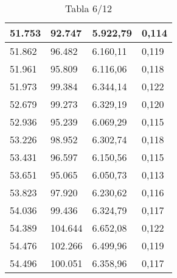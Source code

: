 \begin{table}[H]
{\begin{tabular}{| l | l | l |l |}
51.753	&	92.747	&	5.922,79	&	0,114	\\ \hline
51.862	&	96.482	&	6.160,11	&	0,119	\\ \hline
51.961	&	95.809	&	6.116,06	&	0,118	\\ \hline
51.973	&	99.384	&	6.344,14	&	0,122	\\ \hline
52.679	&	99.273	&	6.329,19	&	0,120	\\ \hline
52.936	&	95.239	&	6.069,29	&	0,115	\\ \hline
53.226	&	98.952	&	6.302,74	&	0,118	\\ \hline
53.431	&	96.597	&	6.150,56	&	0,115	\\ \hline
53.651	&	95.065	&	6.050,73	&	0,113	\\ \hline
53.823	&	97.920	&	6.230,62	&	0,116	\\ \hline
54.036	&	99.436	&	6.324,79	&	0,117	\\ \hline
54.389	&	104.644	&	6.652,08	&	0,122	\\ \hline
54.476	&	102.266	&	6.499,96	&	0,119	\\ \hline
54.496	&	100.051	&	6.358,96	&	0,117	\\ \hline
  \end{tabular}
  \caption*{Tabla 6/12}
}
\end{table}
